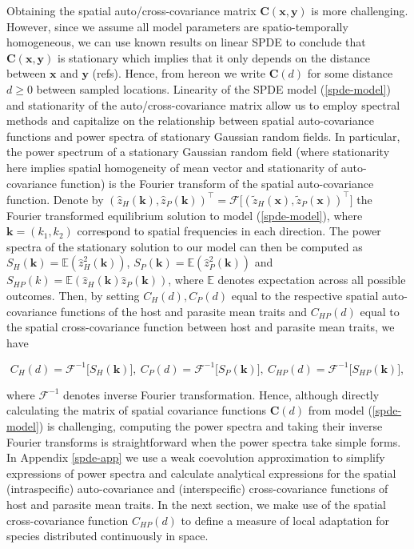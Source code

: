 \documentclass{article}
\begin{document}
Obtaining the spatial auto/cross-covariance matrix
\(\pmb C(\pmb x,\pmb y)\) is more challenging. However, since we assume
all model parameters are spatio-temporally homogeneous, we can use known
results on linear SPDE to conclude that \(\pmb C(\pmb x,\pmb y)\) is
stationary which implies that it only depends on the distance between
\(\pmb x\) and \(\pmb y\) (refs). Hence, from hereon we write
\(\pmb C(d)\) for some distance \(d\geq0\) between sampled locations.
Linearity of the SPDE model (\ref{spde-model}) and stationarity of the
auto/cross-covariance matrix allow us to employ spectral methods and
capitalize on the relationship between spatial auto-covariance functions
and power spectra of stationary Gaussian random fields. In particular,
the power spectrum of a stationary Gaussian random field (where
stationarity here implies spatial homogeneity of mean vector and
stationarity of auto-covariance function) is the Fourier transform of
the spatial auto-covariance function. Denote by
\((\hat z_H(\pmb k),\hat z_P(\pmb k))^\top=\mathcal F\big[(\tilde z_H(\pmb x),\tilde z_P(\pmb x))^\top\big]\)
the Fourier transformed equilibrium solution to model
(\ref{spde-model}), where \(\pmb k=(k_1,k_2)\) correspond to spatial
frequencies in each direction. The power spectra of the stationary
solution to our model can then be computed as
\(S_H(\pmb k)=\mathbb E(\hat z_H^2(\pmb k))\),
\(S_P(\pmb k)=\mathbb E(\hat z_P^2(\pmb k))\) and
\(S_{HP}(k)=\mathbb E(\hat z_H(\pmb k)\hat z_P(\pmb k))\), where
\(\mathbb E\) denotes expectation across all possible outcomes. Then, by
setting \(C_H(d), C_P(d)\) equal to the respective spatial
auto-covariance functions of the host and parasite mean traits and
\(C_{HP}(d)\) equal to the spatial cross-covariance function between
host and parasite mean traits, we have

\begin{equation}
  C_H(d) = \mathcal F^{-1}\big[S_H(\pmb k)\big], \ C_P(d) = \mathcal F^{-1}\big[S_P(\pmb k)\big], \ C_{HP}(d)=\mathcal F^{-1}\big[S_{HP}(\pmb k)],
\end{equation}

where \(\mathcal F^{-1}\) denotes inverse Fourier transformation. Hence,
although directly calculating the matrix of spatial covariance functions
\(\pmb C(d)\) from model (\ref{spde-model}) is challenging, computing
the power spectra and taking their inverse Fourier transforms is
straightforward when the power spectra take simple forms. In Appendix
\ref{spde-app} we use a weak coevolution approximation to simplify
expressions of power spectra and calculate analytical expressions for
the spatial (intraspecific) auto-covariance and (interspecific)
cross-covariance functions of host and parasite mean traits. In the next
section, we make use of the spatial cross-covariance function
\(C_{HP}(d)\) to define a measure of local adaptation for species
distributed continuously in space.
\end{document}
